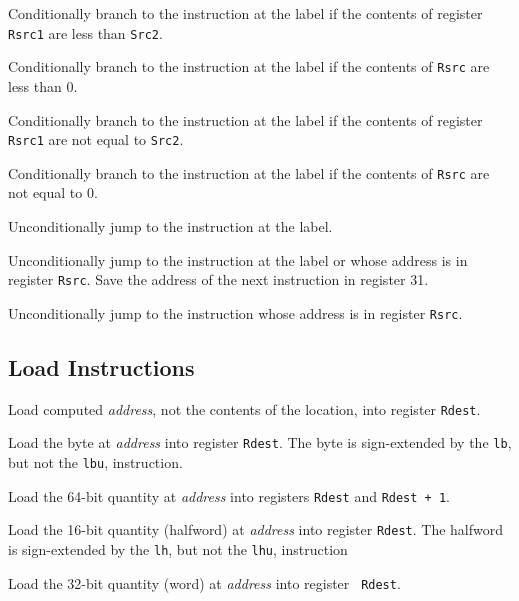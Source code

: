\documentclass[11pt]{article}
\begin{document}
Conditionally branch to the instruction at the label if the contents
of register {\tt Rsrc1} are less than {\tt Src2}.

Conditionally branch to the instruction at the label if the contents
of {\tt Rsrc} are less than 0.

Conditionally branch to the instruction at the label if the contents
of register {\tt Rsrc1} are not equal to {\tt Src2}.

Conditionally branch to the instruction at the label if the contents
of {\tt Rsrc} are not equal to 0.

Unconditionally jump to the instruction at the label.

Unconditionally jump to the instruction at the label or whose address
is in register {\tt Rsrc}.  Save the address of the next
instruction in register 31.

Unconditionally jump to the instruction whose address is in register
{\tt Rsrc}.


\subsection {Load Instructions}

Load computed {\em address\/}, not the contents of the location, into
register {\tt Rdest}.

Load the byte at {\em address\/} into register {\tt Rdest}.  The byte
is sign-extended by the {\tt lb}, but not the {\tt lbu}, instruction.

Load the 64-bit quantity at {\em address\/} into registers {\tt Rdest}
and {\tt Rdest + 1}.

Load the 16-bit quantity (halfword) at {\em address\/} into register
{\tt Rdest}.  The halfword is sign-extended by the {\tt lh}, but not
the {\tt lhu}, instruction

Load the 32-bit quantity (word) at {\em address\/} into register {\tt
Rdest}.
\end{document}

